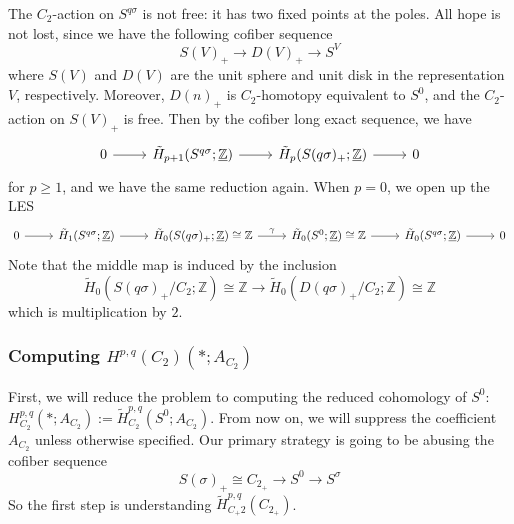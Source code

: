 \documentclass{article}
\theoremstyle{definition}
\begin{document}
The $C_2$-action on $S^{q\sigma}$ is not free: it has two fixed points at the poles. All hope is not lost, since we have the following cofiber sequence 
\[S(V)_{+}\to D(V)_{+}\to S^V\]
where $S(V)$ and $D(V)$ are the unit sphere and unit disk in the representation $V$, respectively. Moreover, $D(n)_{+}$ is $C_2$-homotopy equivalent to $S^0$, and the $C_2$-action on $S(V)_+$ is free. Then by the cofiber long exact sequence, we have 
\[\begin{tikzcd}
0\arrow[r]&\tilde{H}_{p+1}(S^{q\sigma};\underline{\mathbb{Z}})\arrow[r]&\tilde{H}_{p}(S(q\sigma)_+;\underline{\mathbb{Z}})\arrow[r]&0
\end{tikzcd}\]
for $p\geq 1$, and we have the same reduction again. When $p=0$, we open up the LES 
\[\begin{tikzcd}
 0\arrow[r]&\tilde{H}_{1}(S^{q\sigma};\underline{\mathbb{Z}})\arrow[r]&\tilde{H}_{0}(S(q\sigma)_+;\underline{\mathbb{Z}})\cong \mathbb{Z}\arrow[r,"\gamma"]&\tilde{H}_{0}(S^0;\underline{\mathbb{Z}})\cong \mathbb{Z}\arrow[r]&\tilde{H}_{0}(S^{q\sigma};\underline{\mathbb{Z}})\arrow[r]&0
    \end{tikzcd}\]
Note that the middle map is induced by the inclusion 
\[\tilde{H}_0(S(q\sigma)_+/C_2;\mathbb{Z})\cong \mathbb{Z}\to \tilde{H}_0(D(q\sigma)_+/C_2;\mathbb{Z})\cong \mathbb{Z}\]
which is multiplication by $2$. 

\subsubsection{Computing $H^{p,q}(C_2)(*; A_{C_2})$}
First, we will reduce the problem to computing the reduced cohomology of $S^0$: $H^{p,q}_{C_2}(*; A_{C_2}):= \tilde{H}^{p,q}_{C_2}(S^0; A_{C_2})$. From now on, we will suppress the coefficient $A_{C_2}$ unless otherwise specified. Our primary strategy is going to be abusing the cofiber sequence 
\[S(\sigma)_+\cong C_{2_{+}}\to S^0\to S^{\sigma} \]
So the first step is understanding $\tilde{H}^{p,q}_{C_+2}(C_{2_+})$.
\end{document}
